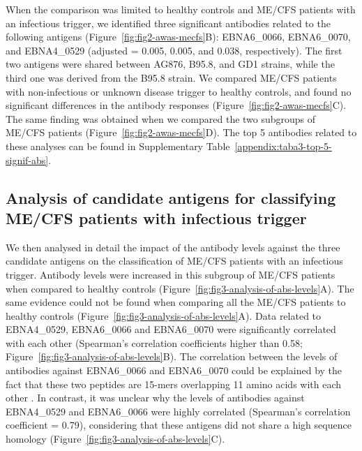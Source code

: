 When the comparison was limited to healthy controls and ME/CFS patients with an infectious trigger, we identified three significant antibodies related to the following antigens (Figure~\ref{fig:fig2-awas-mecfs}B): EBNA6\_0066, EBNA6\_0070, and EBNA4\_0529 (adjusted  = 0.005, 0.005, and 0.038, respectively). The first two antigens were shared between AG876, B95.8, and GD1 strains, while the third one was derived from the B95.8 strain. We compared ME/CFS patients with non-infectious or unknown disease trigger to healthy controls, and found no significant differences in the antibody responses (Figure~\ref{fig:fig2-awas-mecfs}C). The same finding was obtained when we compared the two subgroups of ME/CFS patients (Figure~\ref{fig:fig2-awas-mecfs}D). The top 5 antibodies related to these analyses can be found in Supplementary Table~\ref{appendix:taba3-top-5-signif-abs}.


\clearpage
\subsection{Analysis of candidate antigens for classifying ME/CFS patients with infectious trigger}

We then analysed in detail the impact of the antibody levels against the three candidate antigens on the classification of ME/CFS patients with an infectious trigger. Antibody levels were increased in this subgroup of ME/CFS patients when compared to healthy controls (Figure~\ref{fig:fig3-analysis-of-abs-levels}A). The same evidence could not be found when comparing all the ME/CFS patients to healthy controls (Figure~\ref{fig:fig3-analysis-of-abs-levels}A). Data related to EBNA4\_0529, EBNA6\_0066 and EBNA6\_0070 were significantly correlated with each other (Spearman's correlation coefficients higher than 0.58; Figure~\ref{fig:fig3-analysis-of-abs-levels}B). The correlation between the levels of antibodies against EBNA6\_0066 and EBNA6\_0070 could be explained by the fact that these two peptides are 15-mers overlapping 11 amino acids with each other \citep{loebel2017SerologicalProfiling}. In contrast, it was unclear why the levels of antibodies against EBNA4\_0529 and EBNA6\_0066 were highly correlated (Spearman's correlation coefficient = 0.79), considering that these antigens did not share a high sequence homology (Figure~\ref{fig:fig3-analysis-of-abs-levels}C).

